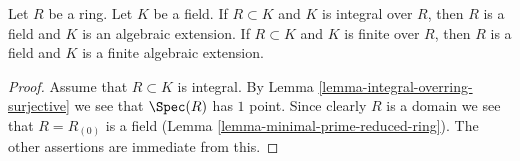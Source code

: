 \begin{lemma}
\label{lemma-integral-under-field}
Let $R$ be a ring. Let $K$ be a field.
If $R \subset K$ and $K$ is integral over $R$,
then $R$ is a field and $K$ is an algebraic extension.
If $R \subset K$ and $K$ is finite over $R$,
then $R$ is a field and $K$ is a finite algebraic extension.
\end{lemma}

\begin{proof}
Assume that $R \subset K$ is integral.
By Lemma \ref{lemma-integral-overring-surjective} we see that
$\Spec(R)$ has $1$ point. Since clearly $R$ is a domain we see
that $R = R_{(0)}$ is a field (Lemma \ref{lemma-minimal-prime-reduced-ring}).
The other assertions are immediate from this.
\end{proof}